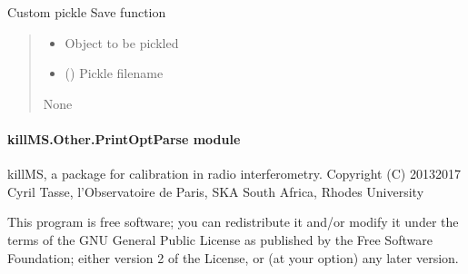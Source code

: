 \documentclass[letterpaper,10pt,english]{sphinxmanual}
\begin{document}
\begin{fulllineitems}
\label{\detokenize{api/killMS.Other:killMS.Other.MyPickle.Save}}
\pysigstartsignatures
{}
\pysigstopsignatures
\sphinxAtStartPar
Custom pickle Save function
\begin{quote}\begin{description}
\begin{itemize}
\item {} 
\sphinxAtStartPar
{} \textendash{} Object to be pickled

\item {} 
\sphinxAtStartPar
{} () \textendash{} Pickle filename

\end{itemize}

\sphinxAtStartPar
None

\end{description}\end{quote}

\end{fulllineitems}



\paragraph{killMS.Other.PrintOptParse module}
\label{\detokenize{api/killMS.Other:module-killMS.Other.PrintOptParse}}\label{\detokenize{api/killMS.Other:killms-other-printoptparse-module}}
\sphinxAtStartPar
killMS, a package for calibration in radio interferometry.
Copyright (C) 2013\sphinxhyphen{}2017  Cyril Tasse, l’Observatoire de Paris,
SKA South Africa, Rhodes University

\sphinxAtStartPar
This program is free software; you can redistribute it and/or
modify it under the terms of the GNU General Public License
as published by the Free Software Foundation; either version 2
of the License, or (at your option) any later version.
\end{document}

